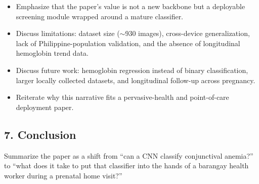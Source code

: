\documentclass[11pt]{article}
\begin{document}
    \begin{itemize}[leftmargin=1.5em]
        \item Emphasize that the paper's value is not a new backbone but a deployable screening module wrapped around a mature classifier.
        \item Discuss limitations: dataset size ($\sim$930 images), cross-device generalization, lack of Philippine-population validation, and the absence of longitudinal hemoglobin trend data.
        \item Discuss future work: hemoglobin regression instead of binary classification, larger locally collected datasets, and longitudinal follow-up across pregnancy.
        \item Reiterate why this narrative fits a pervasive-health and point-of-care deployment paper.
    \end{itemize}

    \subsection{7. Conclusion}

    Summarize the paper as a shift from ``can a CNN classify conjunctival anemia?'' to ``what does it take to put that classifier into the hands of a barangay health worker during a prenatal home visit?''

    
\end{document}
